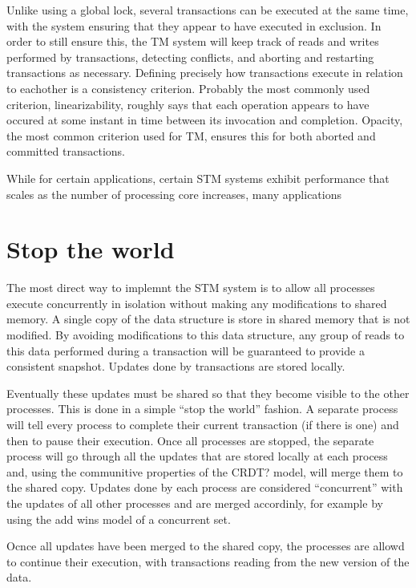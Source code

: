 \documentclass[11pt,letterpaper]{article}
\begin{document}
Unlike using a global lock, several transactions can be executed at the same time,
with the system ensuring that they appear to have executed in exclusion.
In order to still ensure this, the TM system will keep track of reads and writes
performed by transactions, detecting conflicts, and aborting and restarting transactions
as necessary.
Defining precisely how transactions execute in relation to eachother is a consistency criterion.
Probably the most commonly used criterion, linearizability, roughly says that each
operation appears to have occured at some instant in time between its invocation and completion.
Opacity, the most common criterion used for TM, ensures this for both aborted and committed transactions.

While for certain applications, certain STM systems exhibit performance that scales as the number
of processing core increases, many applications 

\section{Stop the world}

The most direct way to implemnt the STM system is to allow all processes
execute concurrently in isolation without making any modifications to shared memory.
A single copy of the data structure is store in shared memory that is not modified.
By avoiding modifications to this data structure, any group of reads to this data
performed during a transaction will be guaranteed to provide a consistent snapshot.
Updates done by transactions are stored locally.

Eventually these updates must be shared so that they become visible to the other processes.
This is done in a simple ``stop the world'' fashion.
A separate process will tell every process to complete their current transaction (if there is one) and then to pause
their execution.
Once all processes are stopped, the separate process will go through all the updates that are stored locally at
each process and, using the communitive properties of the CRDT? model, will merge them to the shared copy.
Updates done by each process are considered ``concurrent'' with the updates of all other processes and are merged
accordinly, for example by using the add wins model of a concurrent set.

Ocnce all updates have been merged to the shared copy, the processes are allowd to continue their execution,
with transactions reading from the new version of the data.
\end{document}
